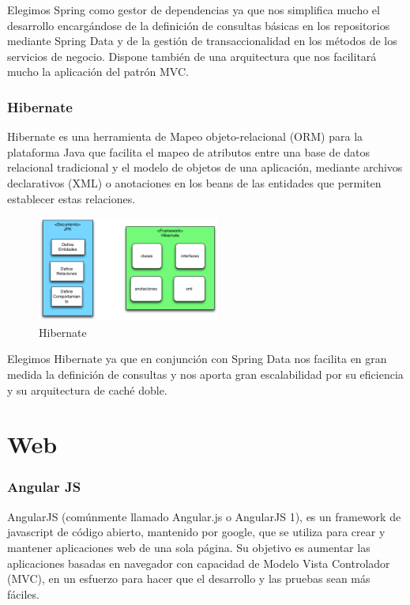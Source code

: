 \documentclass[12pt, a4paper, twoside]{book}
\begin{document}
	Elegimos Spring como gestor de dependencias ya que nos simplifica mucho el desarrollo encargándose de la definición de consultas básicas en los repositorios mediante Spring Data y de la gestión de transaccionalidad en los métodos de los servicios de negocio. Dispone también de una arquitectura que nos facilitará mucho la aplicación del patrón MVC.

	\subsubsection{Hibernate}	
	Hibernate es una herramienta de Mapeo objeto-relacional (ORM) para la
	plataforma Java que facilita el mapeo de atributos entre una base de datos
	relacional tradicional y el modelo de objetos de una aplicación, mediante archivos
	declarativos (XML) o anotaciones en los beans de las entidades que permiten
	establecer estas relaciones.\\
	\begin{center}
		\begin{figure}[H]
			\centering
			\includegraphics[width=6cm]{Imagenes/hibernate.png}
			\caption{Hibernate}\label{hibernate}
		\end{figure}
	\end{center}

	Elegimos Hibernate ya que en conjunción con Spring Data nos facilita en gran medida la definición de consultas y nos aporta gran escalabilidad por su eficiencia y su arquitectura de caché doble.
	\section{Web}
	\subsubsection{Angular JS}
	AngularJS (comúnmente llamado Angular.js o AngularJS 1), es un framework de javascript de código abierto, mantenido por google, que se utiliza para crear y mantener aplicaciones web de una sola página. Su objetivo es aumentar las aplicaciones basadas en navegador con capacidad de Modelo Vista Controlador (MVC), en un esfuerzo para hacer que el desarrollo y las pruebas sean más fáciles.
	
\end{document}

